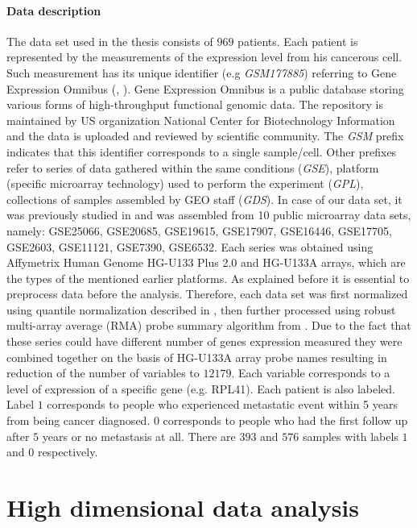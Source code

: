\documentclass[shortabstract, english, mgr]{iithesis}
\begin{document}
\subsubsection{Data description}

The data set used in the thesis consists of $969$ patients. Each patient is represented by the measurements of the expression level from his cancerous cell. Such measurement has its unique identifier (e.g \textit{GSM177885}) referring to Gene Expression Omnibus (\cite{GEO}, \cite{NCBI2}). Gene Expression Omnibus is a public database storing various forms of high-throughput functional genomic data. The repository is maintained by US organization National Center for Biotechnology Information and the data is uploaded and reviewed by scientific community. The \textit{GSM} prefix indicates that this identifier corresponds to a single sample/cell. Other prefixes refer to series of data gathered within the same conditions (\textit{GSE}), platform (specific microarray technology) used to perform the experiment (\textit{GPL}), collections of samples assembled by GEO staff (\textit{GDS}). In case of our data set, it was previously studied in \cite{dataOrigin} and was assembled from 10 public microarray data sets, namely: GSE25066, GSE20685, GSE19615, GSE17907, GSE16446, GSE17705, GSE2603, GSE11121, GSE7390, GSE6532. Each series was obtained using Affymetrix Human Genome HG-U133 Plus 2.0 and HG-U133A arrays, which are the types of the mentioned earlier platforms. As explained before it is essential to preprocess data before the analysis. Therefore, each data set was first normalized using quantile normalization described in \cite{quantileNorm}, then further processed using robust multi-array average (RMA) probe summary algorithm from \cite{preprocessing}. Due to the fact that these series could have different number of genes expression measured they were combined together on the basis of HG-U133A array probe names resulting in reduction of the number of variables to $12179$. Each variable corresponds to a level of expression of a specific gene (e.g. RPL41). Each patient is also labeled. Label $1$ corresponds to people who experienced metastatic event within 5 years from being cancer diagnosed. $0$ corresponds to people who had the first follow up after $5$ years or no metastasis at all. There are $393$ and $576$ samples with labels $1$ and $0$ respectively.

\chapter{High dimensional data analysis} \label{section:methods}
\end{document}
